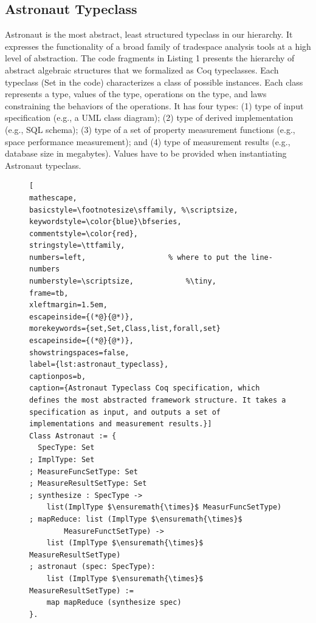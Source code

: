 \documentclass[10pt,conference]{IEEEtran}
\begin{document}
\subsection{Astronaut Typeclass}
Astronaut is the most abstract, least structured typeclass in our hierarchy. It expresses the functionality of a broad family of tradespace analysis tools at a high level of abstraction. The code fragments in Listing 1 presents the hierarchy of abstract algebraic structures that we formalized as Coq typeclasses. Each typeclass (\textsf{Set} in the code) characterizes a class of possible instances. Each class represents a type, values of the type, operations on the type, and laws constraining the behaviors of the operations. It has four types: (1) type of input specification (e.g., a UML class diagram); (2) type of derived implementation (e.g., SQL schema); (3) type of a set of property measurement functions (e.g., space performance measurement); and (4) type of measurement results (e.g., database size in megabytes). Values have to be provided when instantiating Astronaut typeclass. %

\begin{figure}
\vspace{1cm}
\begin{lstlisting}[
mathescape,
basicstyle=\footnotesize\sffamily, %\scriptsize,
keywordstyle=\color{blue}\bfseries,
commentstyle=\color{red},
stringstyle=\ttfamily,
numbers=left,					% where to put the line-numbers
numberstyle=\scriptsize,			%\tiny,      
frame=tb,
xleftmargin=1.5em,
escapeinside={(*@}{@*)},	
morekeywords={set,Set,Class,list,forall,set}
escapeinside={(*@}{@*)},
showstringspaces=false,
label={lst:astronaut_typeclass},
captionpos=b,
caption={Astronaut Typeclass Coq specification, which defines the most abstracted framework structure. It takes a specification as input, and outputs a set of implementations and measurement results.}]
Class Astronaut := {
  SpecType: Set
; ImplType: Set
; MeasureFuncSetType: Set
; MeasureResultSetType: Set
; synthesize : SpecType ->
    list(ImplType $\ensuremath{\times}$ MeasurFuncSetType)
; mapReduce: list (ImplType $\ensuremath{\times}$
    	MeasureFunctSetType) ->
    list (ImplType $\ensuremath{\times}$ MeasureResultSetType)
; astronaut (spec: SpecType):
    list (ImplType $\ensuremath{\times}$ MeasureResultSetType) :=
    map mapReduce (synthesize spec)
}.
\end{lstlisting}
 \end{figure}
\end{document}
